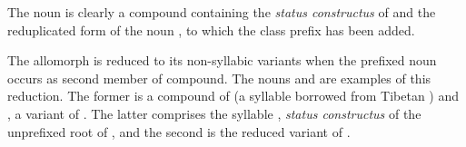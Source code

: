 The noun  is clearly a compound containing the \textit{status constructus} of  and the reduplicated form of the noun , to which the class prefix  has been added.

The allomorph  is reduced to its non-syllabic variants  when the prefixed noun occurs as second member of compound. The nouns  and  are examples of this reduction. The former is a compound of  (a syllable borrowed  from Tibetan ) and , a variant of . The latter comprises the syllable , \textit{status constructus} of the unprefixed root of , and the second  is the reduced variant of .

